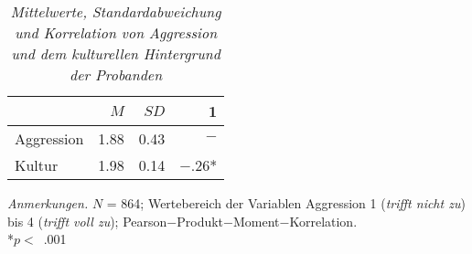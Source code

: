 \begin{table}[htb]
  \caption[Mittelwerte, Standardabweichung und Korrelation von Aggression und dem kulturellen Hintergrund der Probanden]{\textit {Mittelwerte, Standardabweichung und Korrelation von Aggression und dem kulturellen Hintergrund der Probanden}} 
  \label{explo_4_4_2}
  \centering
  \begin{adjustbox}{width=6cm} %
  \small
  \begin{tabular}{lrrr}
    \hline
      & $M$   & $SD$ & 1 \\
    \hline
  Aggression      & 1.88 & 0.43  & $-$      \\
  Kultur          & 1.98 & 0.14  & $-$.26*      \\
     \hline
  \end{tabular}
  \end{adjustbox}
  
  \begin{tablenotes}
      \item \textit{Anmerkungen.} \( N \) = 864; Wertebereich der Variablen Aggression 1 (\textit{trifft nicht zu}) bis 4 (\textit{trifft voll zu}); Pearson$-$Produkt$-$Moment$-$Korrelation. \\ *$p<$~.001
    \end{tablenotes}
  \end{table}

